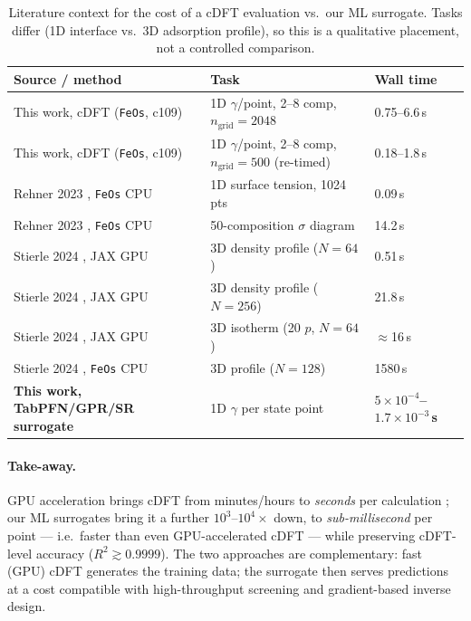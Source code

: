 \documentclass[11pt]{article}
\begin{document}
\begin{table}[t]
\centering
\caption{Literature context for the cost of a cDFT evaluation vs.\ our ML
surrogate. Tasks differ (1D interface vs.\ 3D adsorption profile), so this is a
qualitative placement, not a controlled comparison.}
\label{tab:lit}
\small
\begin{tabular}{lll}
\toprule
Source / method & Task & Wall time \\
\midrule
This work, cDFT (\texttt{FeOs}, c109) & 1D $\gamma$/point, 2--8 comp, $n_\mathrm{grid}{=}2048$ & 0.75--6.6\,s \\
This work, cDFT (\texttt{FeOs}, c109) & 1D $\gamma$/point, 2--8 comp, $n_\mathrm{grid}{=}500$ (re-timed) & 0.18--1.8\,s \\
Rehner 2023 \cite{rehner2023feos}, \texttt{FeOs} CPU & 1D surface tension, 1024 pts & 0.09\,s \\
Rehner 2023 \cite{rehner2023feos}, \texttt{FeOs} CPU & 50-composition $\sigma$ diagram & 14.2\,s \\
Stierle 2024 \cite{stierle2024gpu}, JAX GPU & 3D density profile ($N{=}64$)   & 0.51\,s \\
Stierle 2024 \cite{stierle2024gpu}, JAX GPU & 3D density profile ($N{=}256$)  & 21.8\,s \\
Stierle 2024 \cite{stierle2024gpu}, JAX GPU & 3D isotherm (20 $p$, $N{=}64$)  & $\approx$16\,s \\
Stierle 2024 \cite{stierle2024gpu}, \texttt{FeOs} CPU & 3D profile ($N{=}128$) & 1580\,s \\
\textbf{This work, TabPFN/GPR/SR surrogate} & 1D $\gamma$ per state point & \textbf{$5\times10^{-4}$--$1.7\times10^{-3}$\,s} \\
\bottomrule
\end{tabular}
\end{table}

\paragraph{Take-away.}
GPU acceleration brings cDFT from minutes/hours to \emph{seconds} per calculation
\cite{stierle2024gpu}; our ML surrogates bring it a further $10^3$--$10^4\times$
down, to \emph{sub-millisecond} per point --- i.e.\ faster than even
GPU-accelerated cDFT --- while preserving cDFT-level accuracy
($R^2\gtrsim0.9999$). The two approaches are complementary: fast (GPU) cDFT
generates the training data; the surrogate then serves predictions at a cost
compatible with high-throughput screening and gradient-based inverse design.
\end{document}
